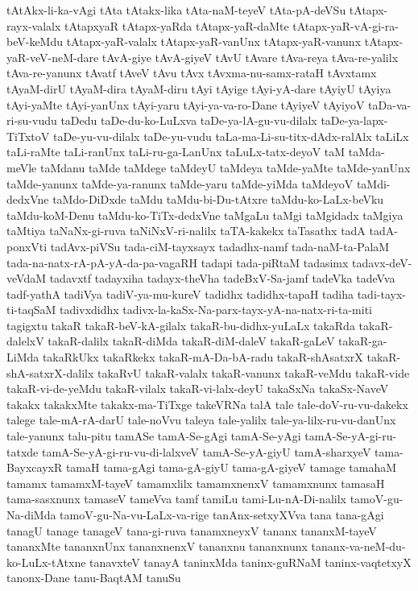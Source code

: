 {tAtAkx-li-ka-vAgi
tAta
tAtakx-lika
tAta-naM-teyeV
tAta-pA-deVSu
tAtapx-rayx-valalx
tAtapxyaR
tAtapx-yaRda
tAtapx-yaR-daMte
tAtapx-yaR-vA-gi-ra-beV-keMdu
tAtapx-yaR-valalx
tAtapx-yaR-vanUnx
tAtapx-yaR-vanunx
tAtapx-yaR-veV-neM-dare
tAvA-giye
tAvA-giyeV
tAvU
tAvare
tAva-reya
tAva-re-yalilx
tAva-re-yanunx
tAvatf
tAveV
tAvu
tAvx
tAvxma-nu-samx-rataH
tAvxtamx
tAyaM-dirU
tAyaM-dira
tAyaM-diru
tAyi
tAyige
tAyi-yA-dare
tAyiyU
tAyiya
tAyi-yaMte
tAyi-yanUnx
tAyi-yaru
tAyi-ya-va-ro-Dane
tAyiyeV
tAyiyoV
taDa-va-ri-su-vudu
taDedu
taDe-du-ko-LuLxva
taDe-ya-lA-gu-vu-dilalx
taDe-ya-lapx-TiTxtoV
taDe-yu-vu-dilalx
taDe-yu-vudu
taLa-ma-Li-su-titx-dAdx-ralAlx
taLiLx
taLi-raMte
taLi-ranUnx
taLi-ru-ga-LanUnx
taLuLx-tatx-deyoV
taM
taMda-meVle
taMdanu
taMde
taMdege
taMdeyU
taMdeya
taMde-yaMte
taMde-yanUnx
taMde-yanunx
taMde-ya-ranunx
taMde-yaru
taMde-yiMda
taMdeyoV
taMdi-dedxVne
taMdo-DiDxde
taMdu
taMdu-bi-Du-tAtxre
taMdu-ko-LaLx-beVku
taMdu-koM-Denu
taMdu-ko-TiTx-dedxVne
taMgaLu
taMgi
taMgidadx
taMgiya
taMtiya
taNaNx-gi-ruva
taNiNxV-ri-nalilx
taTA-kakekx
taTasathx
tadA
tadA-ponxVti
tadAvx-piVSu
tada-ciM-tayxsayx
tadadhx-namf
tada-naM-ta-PalaM
tada-na-natx-rA-pA-yA-da-pa-vagaRH
tadapi
tada-piRtaM
tadasimx
tadavx-deV-veVdaM
tadavxtf
tadayxiha
tadayx-theVha
tadeBxV-Sa-jamf
tadeVka
tadeVva
tadf-yathA
tadiVya
tadiV-ya-mu-kureV
tadidhx
tadidhx-tapaH
tadiha
tadi-tayx-ti-taqSaM
tadivxdidhx
tadivx-la-kaSx-Na-parx-tayx-yA-na-natx-ri-ta-miti
tagigxtu
takaR
takaR-beV-kA-gilalx
takaR-bu-didhx-yuLaLx
takaRda
takaR-dalelxV
takaR-dalilx
takaR-diMda
takaR-diM-daleV
takaR-gaLeV
takaR-ga-LiMda
takaRkUkx
takaRkekx
takaR-mA-Da-bA-radu
takaR-shAsatxrX
takaR-shA-satxrX-dalilx
takaRvU
takaR-valalx
takaR-vanunx
takaR-veMdu
takaR-vide
takaR-vi-de-yeMdu
takaR-vilalx
takaR-vi-lalx-deyU
takaSxNa
takaSx-NaveV
takakx
takakxMte
takakx-ma-TiTxge
takeVRNa
talA
tale
tale-doV-ru-vu-dakekx
talege
tale-mA-rA-darU
tale-noVvu
taleya
tale-yalilx
tale-ya-lilx-ru-vu-danUnx
tale-yanunx
talu-pitu
tamASe
tamA-Se-gAgi
tamA-Se-yAgi
tamA-Se-yA-gi-ru-tatxde
tamA-Se-yA-gi-ru-vu-di-lalxveV
tamA-Se-yA-giyU
tamA-sharxyeV
tama-BayxcayxR
tamaH
tama-gAgi
tama-gA-giyU
tama-gA-giyeV
tamage
tamahaM
tamamx
tamamxM-tayeV
tamamxlilx
tamamxnenxV
tamamxnunx
tamasaH
tama-sasxnunx
tamaseV
tameVva
tamf
tamiLu
tami-Lu-nA-Di-nalilx
tamoV-gu-Na-diMda
tamoV-gu-Na-vu-LaLx-va-rige
tanAnx-setxyXVva
tana
tana-gAgi
tanagU
tanage
tanageV
tana-gi-ruva
tanamxneyxV
tananx
tananxM-tayeV
tananxMte
tananxnUnx
tananxnenxV
tananxnu
tananxnunx
tananx-va-neM-du-ko-LuLx-tAtxne
tanavxteV
tanayA
taninxMda
taninx-guRNaM
taninx-vaqtetxyX
tanonx-Dane
tanu-BaqtAM
tanuSu
}
